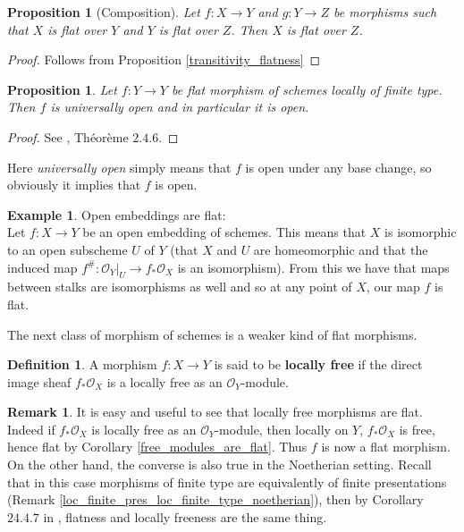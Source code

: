 \documentclass{article}
\theoremstyle{plain}
\newtheorem{proposition}[theorem]{Proposition}
\theoremstyle{definition}
\newtheorem{definition}[theorem]{Definition}
\newtheorem{remark}{Remark}
\newtheorem{example}[theorem]{Example}
\begin{document}
\begin{proposition}[Composition]
\label{composition_flat}
    Let $f:X\rightarrow Y$ and $g:Y\rightarrow Z$ be morphisms such that $X$ is flat over $Y$ and  $Y$ is flat over $Z$.
    Then $X$ is flat over $Z$.
\end{proposition}
\begin{proof}
    Follows from Proposition \ref{transitivity_flatness}
\end{proof}



\begin{proposition}
\label{flat_is_open}
    Let $f:Y\rightarrow Y$ be flat morphism of schemes locally of finite type. Then $f$ is universally open and in particular it is open.
\end{proposition}
\begin{proof}
    See \cite{EGA}, Th\'eor\`eme $2.4.6$.
\end{proof}

\noindent Here \textit{universally open} simply means that $f$ is open under any base change, so obviously it implies that $f$ is open.

\begin{example}Open embeddings are flat:\\
    Let $f:X\rightarrow Y$ be an open embedding of schemes. This means that $X$ is isomorphic to an open subscheme $U$ of $Y$ (that $X$ and $U$ are homeomorphic and that the induced map $f^{\#}:\mathcal{O}_Y\vert_U \rightarrow f_*\mathcal{O}_X$ is an isomorphism).
    From this we have that maps between stalks are isomorphisms as well and so at any point of $X$, our map $f$ is flat.
\end{example}


\noindent The next class of morphism of schemes is a weaker kind of flat morphisms.

\begin{definition}
    A morphism $f:X\rightarrow Y$ is said to be \textbf{locally free} if the direct image sheaf $f_*\mathcal{O}_X$ is a  locally free as an $\mathcal{O}_Y$-module.
\end{definition}

\begin{remark}
\label{locally_free_are_flat_in_noetherian}
    It is easy and useful to see that locally free morphisms are flat.  
    Indeed if $f_*\mathcal{O}_X$ is locally free as an $\mathcal{O}_Y$-module, then locally on $Y$, $f_*\mathcal{O}_X$ is free, hence flat by Corollary \ref{free_modules_are_flat}.
    Thus $f$ is now a flat morphism.\\
    On the other hand, the converse is also true in the Noetherian setting.
    Recall that in this case morphisms of finite type are equivalently of finite presentations (Remark \ref{loc_finite_pres_loc_finite_type_noetherian}), then by Corollary $24.4.7$ in \cite{Vakil}, flatness and locally freeness are the same thing.
\end{remark}
\end{document}
